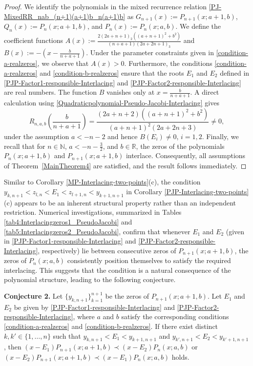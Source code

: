 \documentclass[final,3p,times,12pt]{elsarticle}
\numberwithin{equation}{section}  %
\begin{document}
	\begin{proof}
	We identify the polynomials in the mixed recurrence relation \eqref{PJ-MixedRR_nab_(n+1)(a+1)b_n(a+1)b} as $G_{n+1}(x) := P_{n+1}(x;a+1,b)$, $Q_{n}(x) := P_{n}(x;a+1,b)$, and $P_{n}(x) := P_{n}(x;a,b)$. We define the coefficient functions $A(x) := \frac{2(2a+n+1)_2\left((a+n+1)^2+b^2\right)}{(n+a+1)(2a+2n+1)_3}$ and $B(x) := -\left(x-\frac{b}{n+a+1}\right)$. Under the parameter constraints  given in \eqref{condition-a-realzeros}, we observe that $A(x) > 0$. Furthermore, the conditions \eqref{condition-a-realzeros} and \eqref{condition-b-realzeros} ensure that the roots $E_1$ and $E_2$ defined in \eqref{PJP-Factor1-responsible-Interlacing} and \eqref{PJP-Factor2-responsible-Interlacing} are real numbers. The function $B$ vanishes only at $x=\frac{b}{n+a+1}$. A direct calculation using \eqref{Quadraticpolynomial-Pseudo-Jacobi-Interlacing} gives \[ R_{n,a,b}\left(\frac{b}{n+a+1}\right) = \frac{(2a+n+2)\left((a+n+1)^2+b^2\right)} {(a+n+1)^2(2a+2n+3)} \neq 0, \]under the assumption $a<-n-2$ and hence $B(E_i)\neq 0$, $i=1,2$. Finally, we recall that for $n \in \mathbb{N}$, $a<-n-\frac32$, and $b\in \mathbb{R}$, the zeros of the polynomials $P_{n}(x;a+1,b)$ and $P_{n+1}(x;a+1,b)$  interlace. Consequently, all assumptions of Theorem~\ref{MainTheorem4} are satisfied, and the result follows immediately.
	\end{proof}

    Similar to Corollary \ref{MP-Interlacing-two-points}(c), the condition $y_{k,n+1} < z_{l,n} < E_1 < z_{l+1,n} < y_{k+1,n+1}$ in Corollary \ref{PJP-Interlacing-two-points}(c) appears to be an inherent structural property rather than an independent restriction. Numerical investigations, summarized in Tables \ref{tab4:Interlacingzeros1_PseudoJacobi} and \ref{tab5:Interlacingzeros2_PseudoJacobi}, confirm that whenever $E_1$ and $E_2$ (given in \eqref{PJP-Factor1-responsible-Interlacing} and \eqref{PJP-Factor2-responsible-Interlacing}, respectively) lie between consecutive zeros of $P_{n+1}(x;a+1,b)$, the zeros of $P_{n}(x;a,b)$ consistently position themselves to satisfy the required interlacing. This suggests that the condition is a natural consequence of the polynomial structure, leading to the following conjecture.
	\vspace{0.1cm}
	
	
	\textbf{Conjecture 2.}  Let $\{y_{k,n+1}\}_{k=1}^{n+1}$ be the zeros of $P_{n+1}(x;a+1,b)$. Let $E_1$ and $E_2$ be given by \eqref{PJP-Factor1-responsible-Interlacing} and \eqref{PJP-Factor2-responsible-Interlacing}, where $a$ and $b$ satisfy the corresponding conditions \eqref{condition-a-realzeros} and \eqref{condition-b-realzeros}. If there exist distinct $k, k' \in \{1, \dots, n\}$ such that $y_{k,n+1} < E_1 < y_{k+1,n+1}$ and $y_{k',n+1} < E_2 < y_{k'+1,n+1}$,  then  $\displaystyle (x-E_1) P_{n+1}(x;a+1,b) \prec (x-E_2)P_{n}(x;a,b)$ or $\displaystyle (x-E_2)P_{n+1}(x;a+1,b) \prec (x-E_1)P_{n}(x;a,b)$ holds.
	
\end{document}

